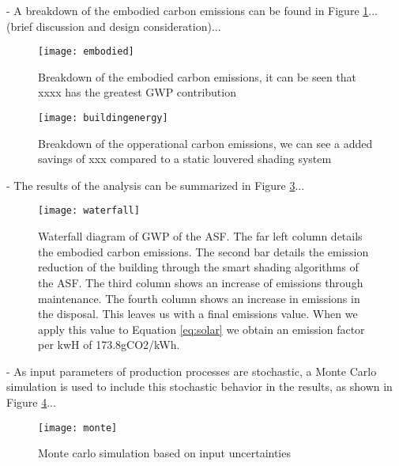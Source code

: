 


- A breakdown of the embodied carbon emissions can be found in Figure  \ref{fig:embodied}... (brief discussion and design consideration)...

\begin{figure}[H]
\begin{center}
\texttt{[image: embodied]}
\caption{Breakdown of the embodied carbon emissions, it can be seen that xxxx has the greatest GWP contribution}
\label{fig:embodied}
\end{center}
\end{figure}


\begin{figure}[H]
\begin{center}
\texttt{[image: buildingenergy]}
\caption{Breakdown of the opperational carbon emissions, we can see a added savings of xxx compared to a static louvered shading system}
\label{fig:operational}
\end{center}
\end{figure}

- The results of the analysis can be summarized in Figure \ref{fig:waterfall}...

\begin{figure}[H]
\begin{center}
\texttt{[image: waterfall]}
\caption{Waterfall diagram of GWP of the ASF. The far left column details the embodied carbon emissions. The second bar details the emission reduction of the building through the smart shading algorithms of the ASF. The third column shows an increase of emissions through maintenance. The fourth column shows an increase in emissions in the disposal. This leaves us with a final emissions value. When we apply this value to Equation \ref{eq:solar} we obtain an emission factor per kwH of 173.8gCO2/kWh.}
\label{fig:waterfall}
\end{center}
\end{figure}


- As input parameters of production processes are stochastic, a Monte Carlo simulation is used to include this stochastic behavior in the results, as shown in Figure \ref{fig:monte}...

\begin{figure}[H]
\begin{center}
\texttt{[image: monte]}
\caption{Monte carlo simulation based on input uncertainties}
\label{fig:monte}
\end{center}
\end{figure}

